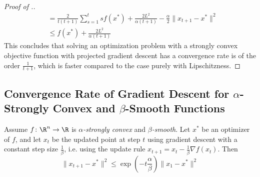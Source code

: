 \begin{proof}[Proof of .]
\begin{align*}
                                                           &= \frac{2}{t(t+1)}\sum_{s=1}^{t}sf(x^{*}) + \frac{2L^{2}}{\alpha(t+1)} - \frac{\alpha}{2}\|x_{t+1} - x^{*}\|^{2} \tag{by telescoping sum}\\
                                                           &\leq f(x^{*}) + \frac{2L^{2}}{\alpha(t+1)}
\end{align*}
This concludes that solving an optimization problem with a strongly convex objective function with projected gradient descent has a convergence rate is of the order $\frac{1}{t+1}$, which is faster compared to the case purely with Lipschitzness.
\end{proof}

\subsection{Convergence Rate of Gradient Descent for $\alpha$-Strongly Convex and $\beta$-Smooth Functions}

\begin{theorem} Assume $f\colon\R^n\to\R$ is \emph{$\alpha$-strongly convex} and \emph{$\beta$-smooth}. Let $x^{*}$ be an optimizer of $f$, and let $x_{t}$ be the updated point at step $t$ using gradient descent with a constant step size $\frac{1}{\beta}$, i.e. using the update rule $x_{t+1} = x_t - \frac{1}{\beta}\nabla f(x_t)$. Then
\[
\|x_{t+1} - x^*\|^2 \leq \exp{(-t \frac{\alpha}{\beta})}\|x_1 - x^*\|^2
\]
\end{theorem}

